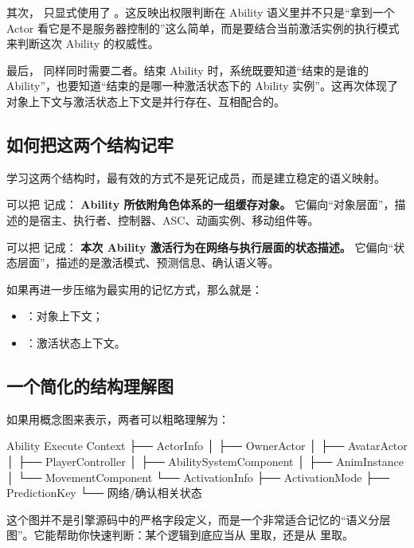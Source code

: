 其次， 只显式使用了 。这反映出权限判断在 Ability 语义里并不只是“拿到一个 Actor 看它是不是服务器控制的”这么简单，而是要结合当前激活实例的执行模式来判断这次 Ability 的权威性。

最后， 同样同时需要二者。结束 Ability 时，系统既要知道“结束的是谁的 Ability”，也要知道“结束的是哪一种激活状态下的 Ability 实例”。这再次体现了对象上下文与激活状态上下文是并行存在、互相配合的。

\subsection{如何把这两个结构记牢}

学习这两个结构时，最有效的方式不是死记成员，而是建立稳定的语义映射。

可以把  记成：	\textbf{Ability 所依附角色体系的一组缓存对象。}
它偏向“对象层面”，描述的是宿主、执行者、控制器、ASC、动画实例、移动组件等。

可以把  记成：	\textbf{本次 Ability 激活行为在网络与执行层面的状态描述。}
它偏向“状态层面”，描述的是激活模式、预测信息、确认语义等。

如果再进一步压缩为最实用的记忆方式，那么就是：

\begin{itemize}
	\item {}：对象上下文；
	\item {}：激活状态上下文。
\end{itemize}

\subsection{一个简化的结构理解图}

如果用概念图来表示，两者可以粗略理解为：

\begin{code}
	Ability Execute Context
	├── ActorInfo
	│   ├── OwnerActor
	│   ├── AvatarActor
	│   ├── PlayerController
	│   ├── AbilitySystemComponent
	│   ├── AnimInstance
	│   └── MovementComponent
	└── ActivationInfo
	├── ActivationMode
	├── PredictionKey
	└── 网络/确认相关状态
\end{code}

这个图并不是引擎源码中的严格字段定义，而是一个非常适合记忆的“语义分层图”。它能帮助你快速判断：某个逻辑到底应当从  里取，还是从  里取。

